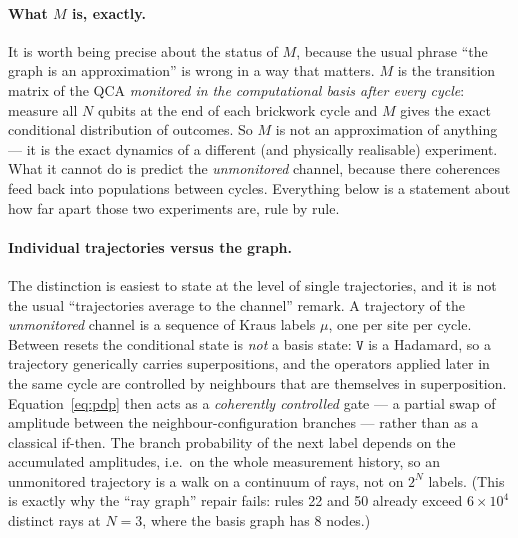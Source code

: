 \documentclass[11pt]{article}
\newcommand{\rt}[1]{\texttt{#1}}
\begin{document}
\paragraph{What $M$ is, exactly.} It is worth being precise about the status of
$M$, because the usual phrase ``the graph is an approximation'' is wrong in a
way that matters. $M$ is the transition matrix of the QCA \emph{monitored in the
computational basis after every cycle}: measure all $N$ qubits at the end of each
brickwork cycle and $M$ gives the exact conditional distribution of outcomes. So
$M$ is not an approximation of anything --- it is the exact dynamics of a
different (and physically realisable) experiment. What it cannot do is predict
the \emph{unmonitored} channel, because there coherences feed back into
populations between cycles. Everything below is a statement about how far apart
those two experiments are, rule by rule.

\paragraph{Individual trajectories versus the graph.} The distinction is easiest
to state at the level of single trajectories, and it is not the usual
``trajectories average to the channel'' remark. A trajectory of the
\emph{unmonitored} channel is a sequence of Kraus labels $\mu$, one per site per
cycle. Between resets the conditional state is \emph{not} a basis state: $\rt V$
is a Hadamard, so a trajectory generically carries superpositions, and the
operators applied later in the same cycle are controlled by neighbours that are
themselves in superposition. Equation~\eqref{eq:pdp} then acts as a
\emph{coherently controlled} gate --- a partial swap of amplitude between the
neighbour-configuration branches --- rather than as a classical if-then. The
branch probability of the next label depends on the accumulated amplitudes, i.e.\
on the whole measurement history, so an unmonitored trajectory is a walk on a
continuum of rays, not on $2^N$ labels. (This is exactly why the ``ray graph''
repair fails: rules 22 and 50 already exceed $6\times10^4$ distinct rays at
$N=3$, where the basis graph has $8$ nodes.)
\end{document}
